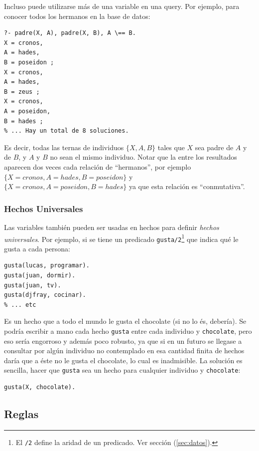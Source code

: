 \documentclass[12pt,titlepage]{article}
\begin{document}
Incluso puede utilizarse más de una variable en una query. Por ejemplo, para conocer todos los hermanos en la base de datos:
\begin{lstlisting}[label=lst:queryhermanos]
% El \== el operador 'distinto'
?- padre(X, A), padre(X, B), A \== B.
X = cronos,
A = hades,
B = poseidon ;
X = cronos,
A = hades,
B = zeus ;
X = cronos,
A = poseidon,
B = hades ;
% ... Hay un total de 8 soluciones.
\end{lstlisting}

Es decir, todas las ternas de individuos $\{X,A,B\}$ tales que $X$ sea padre de $A$ y de $B$, y $A$ y $B$ no sean el mismo individuo. Notar que la entre los resultados aparecen dos veces cada relación de ``hermanos'', por ejemplo $\{X=cronos,A=hades,B=poseidon\}$ y $\{X=cronos,A=poseidon,B=hades\}$ ya que esta relación es ``conmutativa''.

\subsubsection*{Hechos Universales}

Las variables también pueden ser usadas en hechos para definir \emph{hechos universales}. Por ejemplo, si se tiene un predicado \lstinline|gusta/2|\footnote{El \lstinline|/2| define la aridad de un predicado. Ver sección (\ref{sec:datos}).} que indica qué le gusta a cada persona:
\begin{lstlisting}
gusta(lucas, programar).
gusta(juan, dormir).
gusta(juan, tv).
gusta(djfray, cocinar).
% ... etc
\end{lstlisting}

Es un hecho que a todo el mundo le gusta el chocolate (si no lo és, debería). Se podría escribir a mano cada hecho \lstinline|gusta| entre cada individuo y \lstinline|chocolate|, pero eso sería engorroso y además poco robusto, ya que si en un futuro se llegase a consultar por algún individuo no contemplado en esa cantidad finita de hechos daría que a éste no le gusta el chocolate, lo cual es inadmisible. La solución es sencilla, hacer que \lstinline|gusta| sea un hecho para cualquier individuo y \lstinline|chocolate|:
\begin{lstlisting}
gusta(X, chocolate).
\end{lstlisting}

\subsection{Reglas}
\label{sec:reglas}
\end{document}
